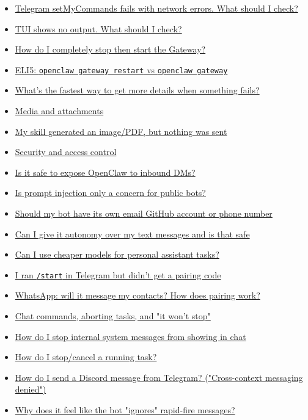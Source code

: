 \begin{itemize}
  \item \href{\#telegram-setmycommands-fails-with-network-errors-what-should-i-check}{Telegram setMyCommands fails with network errors. What should I check?}
  \item \href{\#tui-shows-no-output-what-should-i-check}{TUI shows no output. What should I check?}
  \item \href{\#how-do-i-completely-stop-then-start-the-gateway}{How do I completely stop then start the Gateway?}
  \item \href{\#eli5-openclaw-gateway-restart-vs-openclaw-gateway}{ELI5: \texttt{openclaw gateway restart} vs \texttt{openclaw gateway}}
  \item \href{\#whats-the-fastest-way-to-get-more-details-when-something-fails}{What's the fastest way to get more details when something fails?}
  \item \href{\#media-and-attachments}{Media and attachments}
  \item \href{\#my-skill-generated-an-imagepdf-but-nothing-was-sent}{My skill generated an image/PDF, but nothing was sent}
  \item \href{\#security-and-access-control}{Security and access control}
  \item \href{\#is-it-safe-to-expose-openclaw-to-inbound-dms}{Is it safe to expose OpenClaw to inbound DMs?}
  \item \href{\#is-prompt-injection-only-a-concern-for-public-bots}{Is prompt injection only a concern for public bots?}
  \item \href{\#should-my-bot-have-its-own-email-github-account-or-phone-number}{Should my bot have its own email GitHub account or phone number}
  \item \href{\#can-i-give-it-autonomy-over-my-text-messages-and-is-that-safe}{Can I give it autonomy over my text messages and is that safe}
  \item \href{\#can-i-use-cheaper-models-for-personal-assistant-tasks}{Can I use cheaper models for personal assistant tasks?}
  \item \href{\#i-ran-start-in-telegram-but-didnt-get-a-pairing-code}{I ran \texttt{/start} in Telegram but didn't get a pairing code}
  \item \href{\#whatsapp-will-it-message-my-contacts-how-does-pairing-work}{WhatsApp: will it message my contacts? How does pairing work?}
  \item \href{\#chat-commands-aborting-tasks-and-it-wont-stop}{Chat commands, aborting tasks, and "it won't stop"}
  \item \href{\#how-do-i-stop-internal-system-messages-from-showing-in-chat}{How do I stop internal system messages from showing in chat}
  \item \href{\#how-do-i-stopcancel-a-running-task}{How do I stop/cancel a running task?}
  \item \href{\#how-do-i-send-a-discord-message-from-telegram-crosscontext-messaging-denied}{How do I send a Discord message from Telegram? ("Cross-context messaging denied")}
  \item \href{\#why-does-it-feel-like-the-bot-ignores-rapidfire-messages}{Why does it feel like the bot "ignores" rapid-fire messages?}
\end{itemize}
